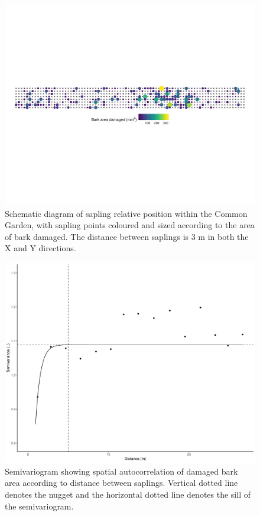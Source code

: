 \documentclass[a4paper, 11pt]{article}
\begin{document}
\begin{figure}
	\includegraphics[width=\textwidth]{sapling_map}
	\caption{Schematic diagram of sapling relative position within the Common Garden, with sapling points coloured and sized according to the area of bark damaged. The distance between saplings is 3 m in both the X and Y directions.}
	\label{sapling_map}
\end{figure}

\begin{figure}
	\includegraphics[width=\textwidth]{semivariogram}
	\caption{Semivariogram showing spatial autocorrelation of damaged bark area according to distance between saplings. Vertical dotted line denotes the nugget and the horizontal dotted line denotes the sill of the semivariogram.}
	\label{semivariogram}
\end{figure}
\end{document}
